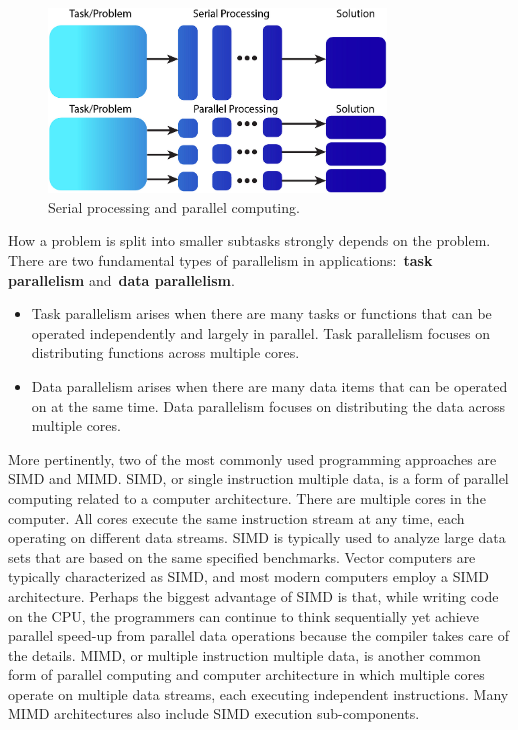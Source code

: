 \begin{figure}[!h]
\centering\includegraphics[width=0.8\textwidth]{fig_logo_history/comput_serial_parallel.png}
\caption{Serial processing and parallel computing.}\label{fig:comput_serial_parallel}
\end{figure}


\par
How a problem is split into smaller subtasks strongly depends on the problem.
There are two fundamental types of parallelism in applications:~\textbf{task parallelism} and~\textbf{data parallelism}.
\begin{itemize}
    \item Task parallelism arises when there are many tasks or functions that can be operated independently and largely in parallel. Task parallelism focuses on distributing functions across multiple cores.
    \item Data parallelism arises when there are many data items that can be operated on at the same time. Data parallelism focuses on distributing the data across multiple cores.
\end{itemize}


\par
More pertinently, two of the most commonly used programming approaches are SIMD and MIMD.
SIMD, or single instruction multiple data, is a form of parallel computing related to a computer architecture.
There are multiple cores in the computer.
All cores execute the same instruction stream at any time, each operating on different data streams.
SIMD is typically used to analyze large data sets that are based on the same specified benchmarks.
Vector computers are typically characterized as SIMD, and most modern computers employ a SIMD architecture.
Perhaps the biggest advantage of SIMD is that, while writing code on the CPU, the programmers can continue to think sequentially yet achieve parallel speed-up from parallel data operations because the compiler takes care of the details.
MIMD, or multiple instruction multiple data, is another common form of parallel computing and computer architecture in which multiple cores operate on multiple data streams, each executing independent instructions.
Many MIMD architectures also include SIMD execution sub-components.


